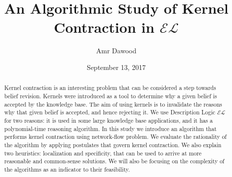 \documentclass{sfuapproval}
\title{An Algorithmic Study of Kernel Contraction in $\mathcal{EL}$}
\author{Amr Dawood}
\date{September 13, 2017}
\theoremstyle{plain}
\theoremstyle{definition}
\begin{document}
\frontmatter
\maketitle{}
\makecommittee{}

\begin{abstract}
Kernel contraction is an interesting problem that can be considered a step towards belief revision. Kernels were introduced as a tool to determine why a given belief is accepted by the knowledge base. The aim of using kernels is to invalidate the reasons why that given belief is accepted, and hence rejecting it. We use Description Logic $\mathcal{EL}$ for two reasons: it is used in some large knowledge base applications, and it has a polynomial-time reasoning algorithm. In this study we introduce an algorithm that performs kernel contraction using network-flow problem. We evaluate the rationality of the algorithm by applying postulates that govern kernel contraction. We also explain two heuristics: localization and specificity, that can be used to arrive at more reasonable and common-sense solutions. We will also be focusing on the complexity of the algorithms as an indicator to their feasibility.
\end{abstract}


%
%

\tableofcontents\clearpage
{}\listoffigures





%
%

\mainmatter%
















\end{document}
